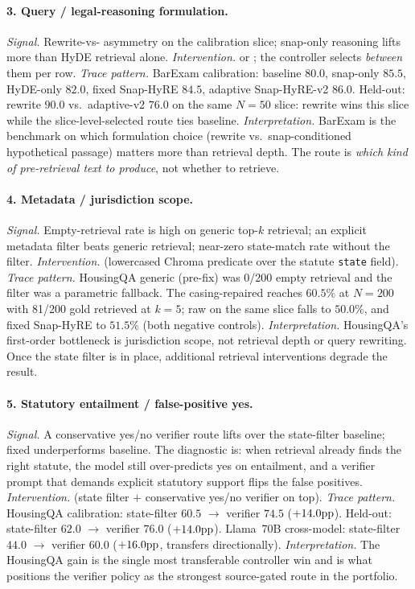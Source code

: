 \paragraph{3. Query / legal-reasoning formulation.}
\emph{Signal.} Rewrite-vs-\hyre{} asymmetry on the calibration slice;
snap-only reasoning lifts more than HyDE retrieval alone.
\emph{Intervention.}  or
; the controller selects \emph{between}
them per row.
\emph{Trace pattern.} BarExam calibration: baseline $80.0$, snap-only
$85.5$, HyDE-only $82.0$, fixed Snap-HyRE $84.5$, adaptive Snap-HyRE-v2
$86.0$. Held-out: rewrite $90.0$ vs.\ adaptive-v2 $76.0$ on the same
$N{=}50$ slice: rewrite wins this slice while the
slice-level-selected \hyre{} route ties baseline.
\emph{Interpretation.} BarExam is the benchmark on which formulation
choice (rewrite vs.\ snap-conditioned hypothetical passage) matters more
than retrieval depth. The route is \emph{which kind of pre-retrieval
text to produce}, not whether to retrieve.

\paragraph{4. Metadata / jurisdiction scope.}
\emph{Signal.} Empty-retrieval rate is high on generic top-$k$ retrieval;
an explicit metadata filter beats generic retrieval; near-zero
state-match rate without the filter.
\emph{Intervention.}  (lowercased Chroma
predicate over the statute \texttt{state} field).
\emph{Trace pattern.} HousingQA generic  (pre-fix)
was 0/200 empty retrieval and the filter was a parametric fallback. The
casing-repaired  reaches $60.5\%$ at $N{=}200$
with 81/200 gold retrieved at $k{=}5$; raw  on the
same slice falls to $50.0\%$, and fixed Snap-HyRE to $51.5\%$ (both
negative controls).
\emph{Interpretation.} HousingQA's first-order bottleneck is
jurisdiction scope, not retrieval depth or query rewriting. Once the
state filter is in place, additional retrieval interventions degrade
the result.

\paragraph{5. Statutory entailment / false-positive yes.}
\emph{Signal.} A conservative yes/no verifier route lifts over the
state-filter baseline; fixed \hyre{} underperforms baseline. The
diagnostic is: when retrieval already finds the right statute, the model
still over-predicts yes on entailment, and a verifier prompt that
demands explicit statutory support flips the false positives.
\emph{Intervention.} 
(state filter $+$ conservative yes/no verifier on top).
\emph{Trace pattern.} HousingQA calibration: state-filter $60.5$ $\rightarrow$ verifier
$74.5$ ($+14.0\mathrm{pp}$). Held-out: state-filter $62.0$ $\rightarrow$ verifier $76.0$
($+14.0\mathrm{pp}$). Llama~70B cross-model: state-filter $44.0$ $\rightarrow$ verifier
$60.0$ ($+16.0\mathrm{pp}$, transfers directionally).
\emph{Interpretation.} The HousingQA gain is the single most
transferable controller win and is what positions the verifier policy
as the strongest source-gated route in the portfolio.

